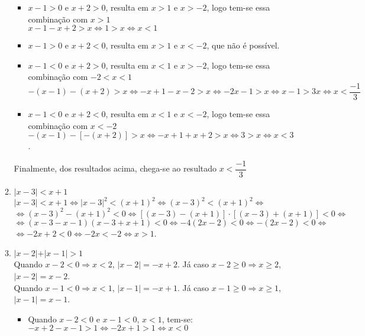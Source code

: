 \documentclass[10pt]{book}
\begin{document}
\begin{enumerate}
\begin{enumerate}
		\begin{itemize}
		\item
		$x-1 > 0$ e $x +2 >0$, resulta em $x > 1$ e $x > -2$, logo tem-se essa combinação com $x > 1$\\
		$x-1-x+2>x \Leftrightarrow 1>x \Leftrightarrow x <1$
		\item
		$x-1 > 0$ e $x +2 <0$, resulta em $x > 1$ e $x < -2$, que não é possível.
		\item
		$x-1 < 0$ e $x +2 >0$, resulta em $x < 1$ e $x > -2$, logo tem-se essa combinação com $-2 < x < 1$\\
		$-(x-1) -(x + 2) >x \Leftrightarrow -x+1 - x -2 >x \Leftrightarrow  -2x-1>x \Leftrightarrow x -1 > 3x \Leftrightarrow x < \dfrac{-1}{3}$
		\item
		$x-1 < 0$ e $x +2 <0$, resulta em $x < 1$ e $x < -2$, logo tem-se essa combinação com $x < -2$\\
		$-(x-1) -[-(x+2)] >x \Leftrightarrow -x + 1 +x + 2 > x \Leftrightarrow 3 >x \Leftrightarrow x < 3$.
		\end{itemize}
		Finalmente, dos resultados acima, chega-se ao resultado $x < \dfrac{-1}{3}$
		\item %
		$\vert x - 3 \vert < x + 1$\\
		$\vert x - 3 \vert < x + 1 \Leftrightarrow \vert x - 3 \vert^2 < (x + 1)^2 \Leftrightarrow (x - 3)^2 < (x + 1)^2 \Leftrightarrow$\\
		$\Leftrightarrow (x - 3)^2 - (x + 1)^2 < 0 \Leftrightarrow [(x - 3) - (x + 1)]\cdot[(x - 3) + (x + 1)] < 0\Leftrightarrow$\\
		$\Leftrightarrow (x - 3 - x - 1)(x - 3 + x + 1) < 0 \Leftrightarrow -4(2x - 2) < 0 \Leftrightarrow -(2x - 2) < 0 \Leftrightarrow$\\
		$\Leftrightarrow -2x + 2 < 0 \Leftrightarrow -2x < - 2 \Leftrightarrow x > 1$.
		\item %
		$\vert x - 2 \vert + \vert x-1 \vert > 1$\\
		Quando $x - 2 < 0 \Rightarrow x < 2$, $\vert x - 2 \vert = -x+2$. Já caso $x - 2 \geq 0 \Rightarrow x \geq 2$,  $\vert x - 2 \vert = x - 2$.\\ 
		 Quando $x-1<0 \Rightarrow x < 1$, $\vert x-1 \vert = -x + 1$. Já caso $x-1 \geq 0 \Rightarrow x \geq 1$, $\vert x - 1 \vert = x - 1$.
		 \begin{itemize}
		 \item 
		 Quando $x -2 < 0$ e $x - 1 < 0$, $x < 1$, tem-se:\\
		 $-x + 2 - x - 1 > 1 \Leftrightarrow -2x +1 > 1 \Leftrightarrow x < 0$

\end{itemize}
\end{enumerate}
\end{enumerate}
\end{document}
